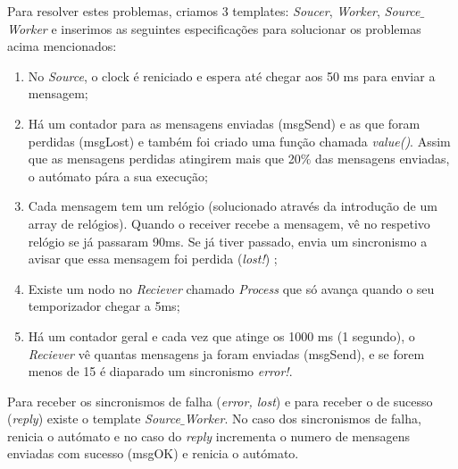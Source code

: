 \documentclass[12pt]{article} %
\begin{document}
Para resolver estes problemas, criamos 3 templates: {\it{Soucer}}, {\it{Worker}}, {\it{Source$\_$Worker}} e inserimos as seguintes especificações para solucionar os problemas acima mencionados:

\begin{enumerate}
\item No {\it{Source}}, o clock é reniciado e espera até chegar aos 50 ms para enviar a mensagem;
\item Há um contador para as mensagens enviadas (msgSend) e as que foram perdidas (msgLost) e também foi criado uma função chamada {\it{value()}}. Assim que as mensagens perdidas atingirem mais que 20$\%$ das mensagens enviadas, o autómato pára a sua execução;
\item Cada mensagem tem um relógio (solucionado através da introdução de um array de relógios). Quando o receiver recebe a mensagem, vê no respetivo  relógio se já passaram 90ms. Se já tiver passado, envia um sincronismo a avisar que essa mensagem foi perdida ({\it{lost!}}) ;
\item Existe um nodo no {\it{Reciever}} chamado {\it{Process}} que só avança quando o seu temporizador chegar a 5ms;
\item Há um contador geral e cada vez que atinge os 1000 ms (1 segundo), o {\it{Reciever}} vê quantas mensagens ja foram enviadas (msgSend), e se forem menos de 15 é diaparado um sincronismo {\it{error!}}.
\end{enumerate}

Para receber os sincronismos de falha ({\it{error, lost}}) e para receber o de sucesso ({\it{reply}}) existe o template {\it{Source$\_$Worker}}. No caso dos sincronismos de falha, renicia o autómato e no caso do 
{\it{reply}} incrementa o numero de mensagens enviadas com sucesso (msgOK) e renicia o autómato.



\end{document}
